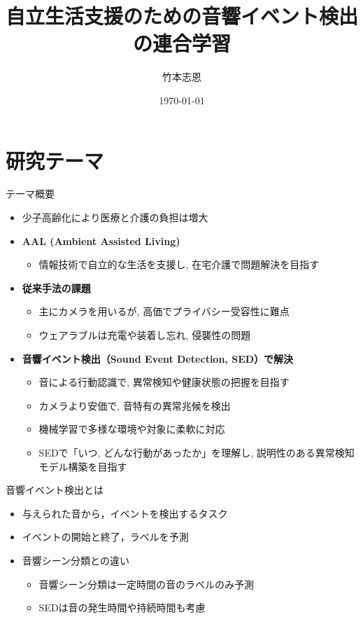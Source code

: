 \documentclass[unicode,12pt,aspectratio=169,dvipdfmx]{beamer}
\title{\textbf{自立生活支援のための音響イベント検出の連合学習}}
\author{竹本志恩}
\date{\today}
\begin{document}
\begin{frame}
  \titlepage
\end{frame}

\section{研究テーマ}
\begin{frame}{テーマ概要}
    \begin{itemize}
        \item 少子高齢化により医療と介護の負担は増大
        \item \textbf{AAL (Ambient Assisted Living)}
        \begin{itemize}
            \item 情報技術で自立的な生活を支援し, 在宅介護で問題解決を目指す
        \end{itemize}
            \item \textbf{従来手法の課題}
        \begin{itemize}
            \item 主にカメラを用いるが, 高価でプライバシー受容性に難点
            \item ウェアラブルは充電や装着し忘れ, 侵襲性の問題
        \end{itemize}
        \item \textbf{音響イベント検出（Sound Event Detection, SED）で解決}
        \begin{itemize}
            \item 音による行動認識で, 異常検知や健康状態の把握を目指す
            \item カメラより安価で, 音特有の異常兆候を検出
            \item 機械学習で多様な環境や対象に柔軟に対応
            \item SEDで「いつ, どんな行動があったか」を理解し, 説明性のある異常検知モデル構築を目指す
        \end{itemize}
    \end{itemize}
\end{frame}


\begin{frame}{音響イベント検出とは}
    \begin{itemize}
        \item 与えられた音から，イベントを検出するタスク
        \item イベントの開始と終了，ラベルを予測
        \item 音響シーン分類との違い
        \begin{itemize}
            \item 音響シーン分類は一定時間の音のラベルのみ予測
            \item SEDは音の発生時間や持続時間も考慮
        \end{itemize}
    \end{itemize}
\end{frame}
\end{document}
